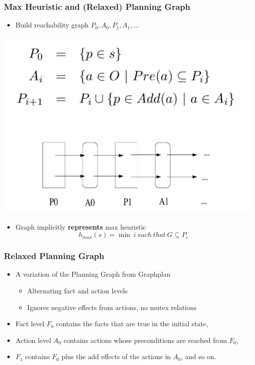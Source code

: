\documentclass{beamer}
\begin{document}
	\begin{frame}[c]\frametitle{Max Heuristic and (Relaxed) Planning Graph}
		\begin{itemize}
			\item Build reachability graph $P_0, A_0, P_1, A_1, \dots$
		\end{itemize}
		\begin{center}
		\includegraphics[width=.5\textwidth]{fig/rpg-example.pdf}
		\end{center}
		\begin{itemize}	
			\item Graph implicitly \textbf{represents} max heuristic
			$$h_{\mathit{max}}(s) = \min~i~\mathit{such~that}~G \subseteq P_{i}$$
		\end{itemize}
	\end{frame}
	
	\begin{frame}[c]\frametitle{Relaxed Planning Graph}
		\begin{itemize}
			\item A variation of the Planning Graph from Graphplan
			\begin{itemize}
				\item Alternating fact and action levels
				\item Ignores negative effects from actions, no mutex relations
			\end{itemize}
			\item Fact level $F_0$ contains the facts that are true in the initial state, 
			\item Action level $A_0$ contains actions whose preconditions are reached from $F_0$,
			\item $F_1$ contains $F_0$ plus the add effects of the actions in $A_0$, and so on.
		\end{itemize}
	\end{frame}
\end{document}
